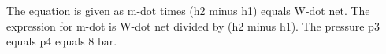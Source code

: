The equation is given as m-dot times (h2 minus h1) equals W-dot net. The expression for m-dot is W-dot net divided by (h2 minus h1). The pressure p3 equals p4 equals 8 bar.